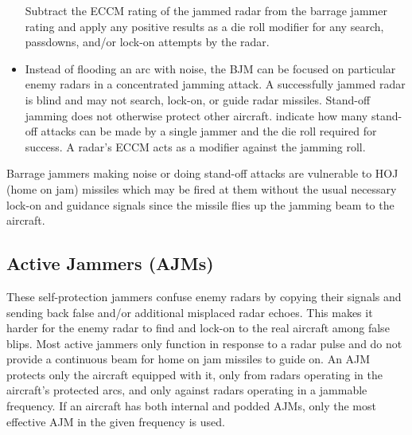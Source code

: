 \begin{advancedrules}
\begin{itemize}
    Subtract the ECCM rating of the jammed radar from the barrage jammer rating and apply any positive results as a die roll modifier for any search, passdowns, and/or lock-on attempts by the radar.

    \item {} Instead of flooding an arc with noise, the BJM can be focused on particular enemy radars in a concentrated jamming attack. A successfully jammed radar is blind and may not search, lock-on, or guide radar missiles. Stand-off jamming does not otherwise protect other aircraft.  indicate how many stand-off attacks can be made by a single jammer and the die roll required for success. A radar's ECCM acts as a modifier against the jamming roll.
    
\end{itemize}



Barrage jammers making noise or doing stand-off attacks are vulnerable to HOJ (home on jam) missiles which may be fired at them without the usual necessary lock-on and guidance signals since the missile flies up the jamming beam to the aircraft.


\subsection{Active Jammers (AJMs)}

These self-protection jammers confuse enemy radars by copying their signals and sending back false and/or additional misplaced radar echoes. This makes it harder for the enemy radar to find and lock-on to the real aircraft among false blips. Most active jammers only function in response to a radar pulse and do not provide a continuous beam for home on jam missiles to guide on. An AJM protects only the aircraft equipped with it, only from radars operating in the aircraft's protected arcs, and only against radars operating in a jammable frequency. If an aircraft has both internal and podded AJMs, only the most effective AJM in the given frequency is used.


\end{advancedrules}
